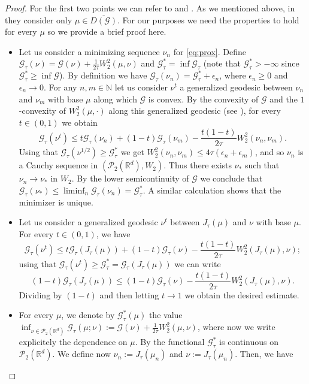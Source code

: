 \documentclass[11pt]{article}
\newcommand{\cP}{\mathcal{P}}
\newcommand{\cG}{\mathcal{G}}
\newcommand{\R}{\mathbb{R}}
\newcommand{\N}{\mathbb{N}}
\numberwithin{equation}{section}
\begin{document}
\begin{proof} For the first two points we can refer to \cite[Lemma 9.2.7]{AGS08} and \cite[Theorem 4.1.2 (i) and (ii)]{AGS08}. As we mentioned above, in \cite{AGS08} they consider only $\mu \in \overline{D(\cG)}$. For our purposes we need the properties to hold for every $\mu $ so we provide a brief proof here.
	
	\begin{itemize}
		\item[(i)] Let us consider a minimizing sequence $\nu_n$ for \eqref{eq:prox}. Define $\cG_{\tau}(\nu)= \cG(\nu) + \frac{1}{2\tau} W_2^2(\mu,\nu) $ and $\cG_\tau^*= \inf \cG_{\tau}$ (note that $\cG_\tau^* > -\infty$ since $\cG_\tau^* \geq \inf \cG$). By definition we have $\cG_{\tau}(\nu_n) = \cG_\tau^*+ \epsilon_n$, where $\epsilon_n \geq 0$ and $\epsilon_n \to 0$. For any $n, m \in \N$ let us consider $\nu^t$ a generalized geodesic between $\nu_n$ and $\nu_m$ with base $\mu$ along which $\cG$ is convex. By the convexity of $\cG$ and the $1$-convexity of $W_2^2(\mu, \cdot)$ along this generalized geodesic (see \cite[Remark 9.2.8]{AGS08}), for every $t \in (0,1)$ we obtain
		$$ \cG_{\tau} (\nu^t)  \leq t \cG_{\tau}(\nu_n)+ (1-t) \cG_{\tau}(\nu_m) - \frac { t(1-t)}{2\tau} W_2^2(\nu_n, \nu_m).$$
		Using that $\cG_{\tau}(\nu^{1/2}) \geq \cG_\tau^*$ we get $W_2^2(\nu_n, \nu_m) \leq 4 \tau ( \epsilon_n + \epsilon_m) $, and so $\nu_n$ is a Cauchy sequence in $(\cP_2(\R^d),W_2)$. Thus there exists $\nu_*$ such that $\nu_n \to \nu_*$ in $W_2$. By the lower semicontinuity of $\cG$ we conclude that $\cG_{\tau}(\nu_*)\leq \liminf_n \cG_{\tau} (\nu_n) = \cG_\tau^*$. A similar calculation shows that the minimizer is unique.
		\item[(ii)] Let us consider a generalized geodesic $\nu^t$ between $J_{\tau}(\mu)$ and $\nu$ with base $\mu$. For every $t\in (0,1)$, we have
		$$ \cG_{\tau} (\nu^t)  \leq t \cG_{\tau}(J_{\tau}(\mu))+ (1-t) \cG_{\tau}(\nu) - \frac { t(1-t)}{2\tau} W_2^2(J_{\tau}(\mu), \nu);$$
		using that $\cG_{\tau}(\nu^t) \geq \cG_\tau^* = \cG_{\tau}(J_{\tau}(\mu))$ we can write 
		$$ (1- t) \cG_{\tau}(J_{\tau}(\mu))\leq (1-t) \cG_{\tau}(\nu) - \frac { t(1-t)}{2\tau} W_2^2(J_{\tau}(\mu), \nu).$$
		Dividing by $(1-t)$ and then letting $t \to 1$ we obtain the desired estimate.
		\item[(iii)] For every $\mu$, we denote by $\cG_\tau^*(\mu)$ the value $\inf_{\nu\in\cP_2(\R^d)} \cG_{\tau}(\mu;\nu) := \cG(\nu) + \frac{1}{2\tau} W_2^2(\mu,\nu) $, where now we write explicitely the dependence on $\mu$. By \cite[Lemma 3.1.2]{AGS08} the functional $\cG_\tau^*$ is continuous on $\cP_2(\R^d)$. We define now $\nu_n:= J_\tau(\mu_n)$ and $\nu:= J_\tau(\mu_n)$. Then, we have

\end{itemize}
\end{proof}
\end{document}

